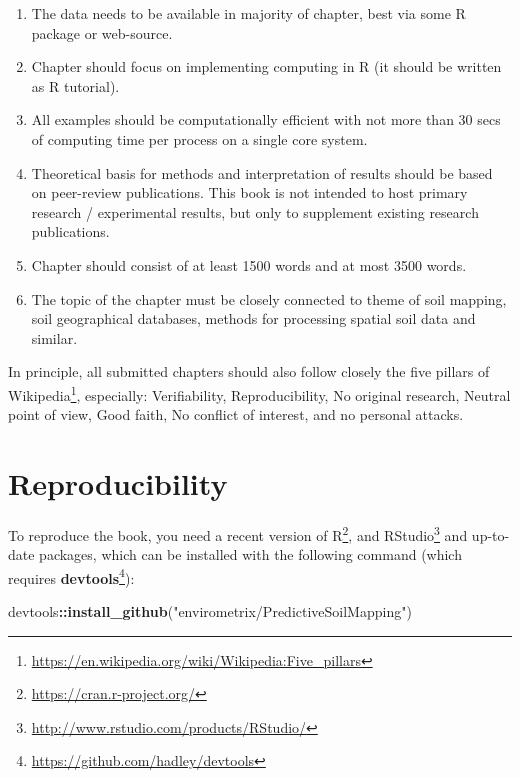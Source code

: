 \documentclass[11pt]{krantz}
\newenvironment{Shaded}{\begin{snugshade}}{\end{snugshade}}
\newcommand{\KeywordTok}[1]{\textcolor[rgb]{0.27,0.27,0.27}{\textbf{#1}}}
\newcommand{\NormalTok}[1]{#1}
\newcommand{\OperatorTok}[1]{\textcolor[rgb]{0.43,0.43,0.43}{\textbf{#1}}}
\newcommand{\StringTok}[1]{\textcolor[rgb]{0.5,0.5,0.5}{#1}}
\providecommand{\tightlist}{%
  \setlength{\itemsep}{0pt}\setlength{\parskip}{0pt}}
\renewcommand{\href}[2]{#2\footnote{\url{#1}}}
\theoremstyle{definition}
\theoremstyle{definition}
\theoremstyle{definition}
\theoremstyle{remark}
\begin{document}
\begin{enumerate}
\def\labelenumi{\arabic{enumi}.}
\tightlist
\item
  The data needs to be available in majority of chapter, best via some R
  package or web-source.
\item
  Chapter should focus on implementing computing in R (it should be
  written as R tutorial).
\item
  All examples should be computationally efficient with not more than 30
  secs of computing time per process on a single core system.
\item
  Theoretical basis for methods and interpretation of results should be
  based on peer-review publications. This book is not intended to host
  primary research / experimental results, but only to supplement
  existing research publications.
\item
  Chapter should consist of at least 1500 words and at most 3500 words.
\item
  The topic of the chapter must be closely connected to theme of soil
  mapping, soil geographical databases, methods for processing spatial
  soil data and similar.
\end{enumerate}

In principle, all submitted chapters should also follow closely the
\href{https://en.wikipedia.org/wiki/Wikipedia:Five_pillars}{five pillars
of Wikipedia}, especially: Verifiability, Reproducibility, No original
research, Neutral point of view, Good faith, No conflict of interest,
and no personal attacks.

\hypertarget{reproducibility}{%
\section*{Reproducibility}\label{reproducibility}}


To reproduce the book, you need a recent version of
\href{https://cran.r-project.org/}{R}, and
\href{http://www.rstudio.com/products/RStudio/}{RStudio} and up-to-date
packages, which can be installed with the following command (which
requires \href{https://github.com/hadley/devtools}{\textbf{devtools}}):

\begin{Shaded}
\begin{Highlighting}[]
\NormalTok{devtools}\OperatorTok{::}\KeywordTok{install_github}\NormalTok{(}\StringTok{"envirometrix/PredictiveSoilMapping"}\NormalTok{)}
\end{Highlighting}
\end{Shaded}
\end{document}
